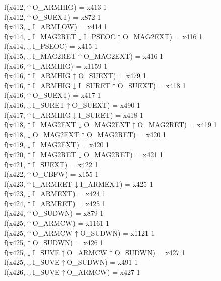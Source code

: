 f(x412,$\uparrow$O\_ARMHIG) = x413 {1} \\
f(x412,$\uparrow$O\_SUEXT) = x872 {1} \\
f(x413,$\downarrow$I\_ARMLOW) = x414 {1} \\
f(x414,$\downarrow$I\_MAG2RET$\downarrow$I\_PSEOC$\uparrow$O\_MAG2EXT) = x416 {1} \\
f(x414,$\downarrow$I\_PSEOC) = x415 {1} \\
f(x415,$\downarrow$I\_MAG2RET$\uparrow$O\_MAG2EXT) = x416 {1} \\
f(x416,$\uparrow$I\_ARMHIG) = x1159 {1} \\
f(x416,$\uparrow$I\_ARMHIG$\uparrow$O\_SUEXT) = x479 {1} \\
f(x416,$\uparrow$I\_ARMHIG$\downarrow$I\_SURET$\uparrow$O\_SUEXT) = x418 {1} \\
f(x416,$\uparrow$O\_SUEXT) = x417 {1} \\
f(x416,$\downarrow$I\_SURET$\uparrow$O\_SUEXT) = x490 {1} \\
f(x417,$\uparrow$I\_ARMHIG$\downarrow$I\_SURET) = x418 {1} \\
f(x418,$\uparrow$I\_MAG2EXT$\downarrow$O\_MAG2EXT$\uparrow$O\_MAG2RET) = x419 {1} \\
f(x418,$\downarrow$O\_MAG2EXT$\uparrow$O\_MAG2RET) = x420 {1} \\
f(x419,$\downarrow$I\_MAG2EXT) = x420 {1} \\
f(x420,$\uparrow$I\_MAG2RET$\downarrow$O\_MAG2RET) = x421 {1} \\
f(x421,$\uparrow$I\_SUEXT) = x422 {1} \\
f(x422,$\uparrow$O\_CBFW) = x155 {1} \\
f(x423,$\uparrow$I\_ARMRET$\downarrow$I\_ARMEXT) = x425 {1} \\
f(x423,$\downarrow$I\_ARMEXT) = x424 {1} \\
f(x424,$\uparrow$I\_ARMRET) = x425 {1} \\
f(x424,$\uparrow$O\_SUDWN) = x879 {1} \\
f(x425,$\uparrow$O\_ARMCW) = x1161 {1} \\
f(x425,$\uparrow$O\_ARMCW$\uparrow$O\_SUDWN) = x1121 {1} \\
f(x425,$\uparrow$O\_SUDWN) = x426 {1} \\
f(x425,$\downarrow$I\_SUVE$\uparrow$O\_ARMCW$\uparrow$O\_SUDWN) = x427 {1} \\
f(x425,$\downarrow$I\_SUVE$\uparrow$O\_SUDWN) = x491 {1} \\
f(x426,$\downarrow$I\_SUVE$\uparrow$O\_ARMCW) = x427 {1} \\
